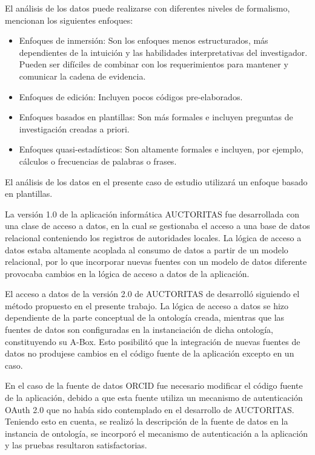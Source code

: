 El análisis de los datos puede realizarse con diferentes niveles de formalismo, \cite{Wohlin2012} mencionan los siguientes enfoques:

\begin{itemize}
\item Enfoques de inmersión: Son los enfoques menos estructurados, más dependientes de la intuición y las habilidades interpretativas del investigador. Pueden ser difíciles de combinar con los requerimientos para mantener y comunicar la cadena de evidencia.
\item Enfoques de edición: Incluyen pocos códigos pre-elaborados.
\item Enfoques basados en plantillas: Son más formales e incluyen preguntas de investigación creadas a priori.
\item Enfoques quasi-estadísticos: Son altamente formales e incluyen, por ejemplo, cálculos o frecuencias de palabras o frases.
\end{itemize}

El análisis de los datos en el presente caso de estudio utilizará un enfoque basado en plantillas.

La versión 1.0 de la aplicación informática AUCTORITAS fue desarrollada con una clase de acceso a datos, en la cual se gestionaba el acceso a una base de datos relacional conteniendo los registros de autoridades locales. La lógica de acceso a datos estaba altamente acoplada al consumo de datos a partir de un modelo relacional, por lo que incorporar nuevas fuentes con un modelo de datos diferente provocaba cambios en la lógica de acceso a datos de la aplicación.

El acceso a datos de la versión 2.0 de AUCTORITAS de desarrolló siguiendo el método propuesto en el presente trabajo. La lógica de acceso a datos se hizo dependiente de la parte conceptual de la ontología creada, mientras que las fuentes de datos son configuradas en la instanciación de dicha ontología, constituyendo su A-Box. Esto posibilitó que la integración de nuevas fuentes de datos no produjese cambios en el código fuente de la aplicación excepto en un caso.

En el caso de la fuente de datos ORCID fue necesario modificar el código fuente de la aplicación, debido a que esta fuente utiliza un mecanismo de autenticación OAuth 2.0 que no había sido contemplado en el desarrollo de AUCTORITAS. Teniendo esto en cuenta, se realizó la descripción de la fuente de datos en la instancia de ontología, se incorporó el mecanismo de autenticación a la aplicación y las pruebas resultaron satisfactorias.

